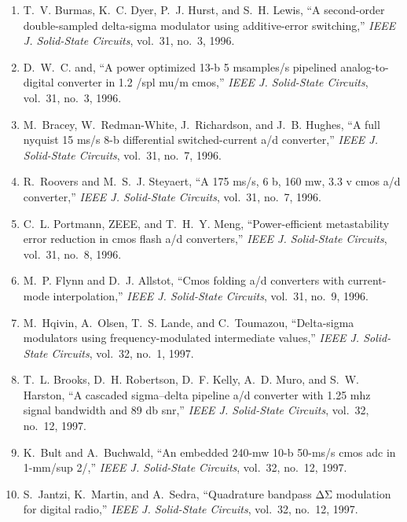 \begin{enumerate}
\item
T.~V. Burmas, K.~C. Dyer, P.~J. Hurst, and S.~H. Lewis, ``A second-order
  double-sampled delta-sigma modulator using additive-error switching,''
  \emph{{IEEE} J. Solid-State Circuits}, vol.~31, no.~3, 1996.

\item
D.~W.~C. and, ``A power optimized 13-b 5 msamples/s pipelined analog-to-digital
  converter in 1.2 /spl mu/m cmos,'' \emph{{IEEE} J. Solid-State Circuits},
  vol.~31, no.~3, 1996.

\item
M.~Bracey, W.~Redman-White, J.~Richardson, and J.~B. Hughes, ``A full nyquist
  15 ms/s 8-b differential switched-current a/d converter,'' \emph{{IEEE} J.
  Solid-State Circuits}, vol.~31, no.~7, 1996.

\item
R.~Roovers and M.~S.~J. Steyaert, ``A 175 ms/s, 6 b, 160 mw, 3.3 v cmos a/d
  converter,'' \emph{{IEEE} J. Solid-State Circuits}, vol.~31, no.~7, 1996.

\item
C.~L. Portmann, ZEEE, and T.~H.~Y. Meng, ``Power-efficient metastability error
  reduction in cmos flash a/d converters,'' \emph{{IEEE} J. Solid-State
  Circuits}, vol.~31, no.~8, 1996.

\item
M.~P. Flynn and D.~J. Allstot, ``Cmos folding a/d converters with current-mode
  interpolation,'' \emph{{IEEE} J. Solid-State Circuits}, vol.~31, no.~9, 1996.

\item
M.~Hqivin, A.~Olsen, T.~S. Lande, and C.~Toumazou, ``Delta-sigma modulators
  using frequency-modulated intermediate values,'' \emph{{IEEE} J. Solid-State
  Circuits}, vol.~32, no.~1, 1997.

\item
T.~L. Brooks, D.~H. Robertson, D.~F. Kelly, A.~D. Muro, and S.~W. Harston, ``A
  cascaded sigma–delta pipeline a/d converter with 1.25 mhz signal bandwidth
  and 89 db snr,'' \emph{{IEEE} J. Solid-State Circuits}, vol.~32, no.~12,
  1997.

\item
K.~Bult and A.~Buchwald, ``An embedded 240-mw 10-b 50-ms/s cmos adc in 1-mm/sup
  2/,'' \emph{{IEEE} J. Solid-State Circuits}, vol.~32, no.~12, 1997.

\item
S.~Jantzi, K.~Martin, and A.~Sedra, ``Quadrature bandpass ΔΣ modulation for
  digital radio,'' \emph{{IEEE} J. Solid-State Circuits}, vol.~32, no.~12,
  1997.


\end{enumerate}
